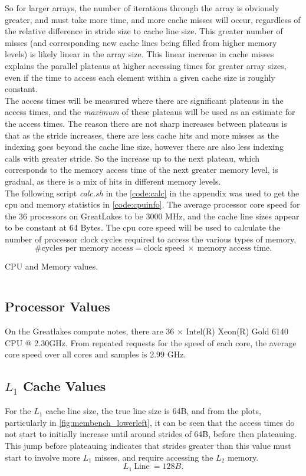\documentclass[letterpaper]{article}
\newenvironment{longlisting}{\captionsetup{type=listing}}{}
\newcommand{\code}[4]{
\begin{longlisting}
    \caption{#3}
    \inputminted[linenos]{#1}{#2}
    \label{code:#4}
\end{longlisting}
}
\begin{document}
So for larger arrays, the number of iterations through the array is obviously greater, and must take more time, and more cache misses will occur, regardless of the relative difference in stride size to cache line size. This greater number of misses (and corresponding new cache lines being filled from higher memory levels) is likely linear in the array size. This linear increase in cache misses explains the parallel plateaus at higher accessing times for greater array sizes, even if the time to access each element within a given cache size is roughly constant. \\

The access times will be measured where there are significant plateaus in the access times, and the \textit{maximum} of these plateaus will be used as an estimate for the access times. The reason there are not sharp increases between plateaus is that as the stride increases, there are less cache hits and more misses as the indexing goes beyond the cache line size, however there are also less indexing calls with greater stride. So the increase up to the next plateau, which corresponds to the memory access time of the next greater memory level, is gradual, as there is a mix of hits in different memory levels. \\

The following script \textit{calc.sh} in the \cref{code:calc} in the appendix was used to get the cpu and memory statistics in \cref{code:cpuinfo}. The average processor core speed for the $36$ processors on GreatLakes to be 3000 MHz, and the cache line sizes appear to be constant at 64 Bytes. The cpu core speed will be used to calculate the number of processor clock cycles required to access the various types of memory, 
$$\textrm{\# cycles per memory access} = \textrm{clock speed}~\times~\textrm{memory access time}.$$

\code{text}{figures/cpuinfo.txt}{CPU and Memory values.}{cpuinfo}

\subsection{Processor Values}
On the Greatlakes compute notes, there are 36 $\times$ Intel(R) Xeon(R) Gold 6140 CPU @ 2.30GHz. From repeated requests for the speed of each core, the average core speed over all cores and samples is 2.99 GHz.

\subsection{$L_1$ Cache Values}
For the $L_1$ cache line size, the true line size is 64B, and from the plots, particularly in \cref{fig:membench_lowerleft}, it can be seen that the access times do not start to initially increase until around strides of 64B, before then plateauing. This jump before plateauing indicates that strides greater than this value must start to involve more $L_1$ misses, and require accessing the $L_2$ memory.
$$ L_1 ~\textrm{Line}~ = 128B. $$
\end{document}
